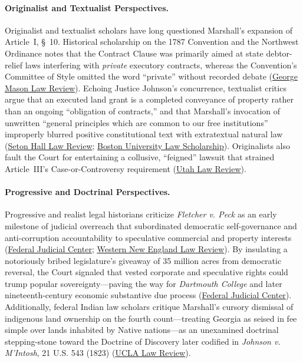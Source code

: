 \documentclass[12pt]{article}
\begin{document}
\paragraph{Originalist and Textualist Perspectives.}
Originalist and textualist scholars have long questioned Marshall's expansion of Article~I, \S~10. Historical scholarship on the 1787 Convention and the Northwest Ordinance notes that the Contract Clause was primarily aimed at state debtor-relief laws interfering with \textit{private} executory contracts, whereas the Convention's Committee of Style omitted the word ``private'' without recorded debate (\href{https://lawreview.gmu.edu/print__issues/passing-a-complete-code-the-framers-failed-effort-to-nationalize-contract-law/}{George Mason Law Review}). Echoing Justice Johnson's concurrence, textualist critics argue that an executed land grant is a completed conveyance of property rather than an ongoing ``obligation of contracts,'' and that Marshall's invocation of unwritten ``general principles which are common to our free institutions'' improperly blurred positive constitutional text with extratextual natural law (\href{https://scholarship.shu.edu/cgi/viewcontent.cgi?article=2470&context=shlr}{Seton Hall Law Review}; \href{https://scholarship.law.bu.edu/cgi/viewcontent.cgi?article=2045&context=faculty_scholarship}{Boston University Law Scholarship}). Originalists also fault the Court for entertaining a collusive, ``feigned'' lawsuit that strained Article~III's Case-or-Controversy requirement (\href{https://dc.law.utah.edu/cgi/viewcontent.cgi?article=1931&context=ulr}{Utah Law Review}).

\paragraph{Progressive and Doctrinal Perspectives.}
Progressive and realist legal historians criticize \textit{Fletcher v. Peck} as an early milestone of judicial overreach that subordinated democratic self-governance and anti-corruption accountability to speculative commercial and property interests (\href{https://www.fjc.gov/history/cases/cases-that-shaped-the-federal-courts/fletcher-v-peck}{Federal Judicial Center}; \href{https://digitalcommons.wne.edu/cgi/viewcontent.cgi?article=1919&context=lawreview}{Western New England Law Review}). By insulating a notoriously bribed legislature's giveaway of 35 million acres from democratic reversal, the Court signaled that vested corporate and speculative rights could trump popular sovereignty---paving the way for \textit{Dartmouth College} and later nineteenth-century economic substantive due process (\href{https://www.fjc.gov/history/cases/cases-that-shaped-the-federal-courts/fletcher-v-peck}{Federal Judicial Center}). Additionally, federal Indian law scholars critique Marshall's cursory dismissal of indigenous land ownership on the fourth count---treating Georgia as seised in fee simple over lands inhabited by Native nations---as an unexamined doctrinal stepping-stone toward the Doctrine of Discovery later codified in \textit{Johnson v. M'Intosh}, 21 U.S. 543 (1823) (\href{https://www.uclalawreview.org/wp-content/uploads/2019/09/12_52UCLALRev2892004-2005.pdf}{UCLA Law Review}).
\end{document}
